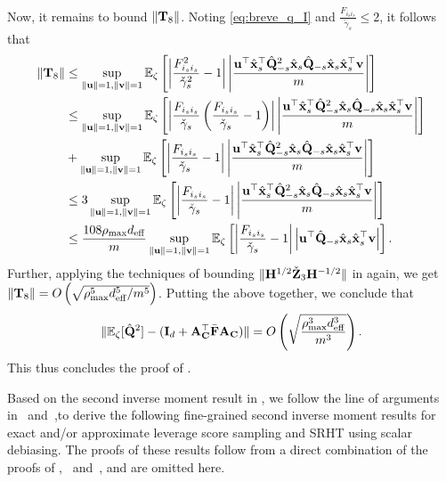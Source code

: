 \documentclass[11pt,a4paper]{article}
\begin{document}
Now, it remains to bound $\|\mathbf{T}_8\|$.  
Noting  \eqref{eq:breve_q_I} and  $\frac{F_{i_si_s}}{\check \gamma_s}\leq 2$, it follows that  
\begin{align}
    \|\mathbf{T}_8\|&\leq\sup\limits_{\|\mathbf{u}\|=1,\|\mathbf{v}\|=1} {\mathbb{E}}_{\zeta}\left[\left|\frac{F_{i_si_s}^2}{\check \gamma^2_s}-1\right|\left|\frac{\mathbf{u}^\top\hat{\mathbf{x}}_s^\top\hat{\mathbf{Q}}^2_{-s}\hat{\mathbf{x}}_s\hat{\mathbf{Q}}_{-s}\hat{\mathbf{x}}_s\hat{\mathbf{x}}_s^\top\mathbf{v}}{m}\right|\right]\nonumber\\
    &\leq\sup\limits_{\|\mathbf{u}\|=1,\|\mathbf{v}\|=1} {\mathbb{E}}_{\zeta}\left[\left|\frac{F_{i_si_s}}{\check \gamma_s}\left(\frac{F_{i_si_s}}{\check \gamma_s}-1\right)\right |\left|\frac{\mathbf{u}^\top\hat{\mathbf{x}}_s^\top\hat{\mathbf{Q}}^2_{-s}\hat{\mathbf{x}}_s\hat{\mathbf{Q}}_{-s}\hat{\mathbf{x}}_s\hat{\mathbf{x}}_s^\top\mathbf{v}}{m}\right|\right]\nonumber\\
    &+\sup\limits_{\|\mathbf{u}\|=1,\|\mathbf{v}\|=1} {\mathbb{E}}_{\zeta}\left[\left|\frac{F_{i_si_s}}{\check \gamma_s}-1\right |\left|\frac{\mathbf{u}^\top\hat{\mathbf{x}}_s^\top\hat{\mathbf{Q}}^2_{-s}\hat{\mathbf{x}}_s\hat{\mathbf{Q}}_{-s}\hat{\mathbf{x}}_s\hat{\mathbf{x}}_s^\top\mathbf{v}}{m}\right|\right]\nonumber\\
    &\leq3\sup\limits_{\|\mathbf{u}\|=1,\|\mathbf{v}\|=1} {\mathbb{E}}_{\zeta}\left[\left|\frac{F_{i_si_s}}{\check \gamma_s}-1\right |\left|\frac{\mathbf{u}^\top\hat{\mathbf{x}}_s^\top\hat{\mathbf{Q}}^2_{-s}\hat{\mathbf{x}}_s\hat{\mathbf{Q}}_{-s}\hat{\mathbf{x}}_s\hat{\mathbf{x}}_s^\top\mathbf{v}}{m}\right|\right]\nonumber\\
     &\leq\frac{108\rho_{\max} d_{\mathrm{eff}}}{m}\sup\limits_{\|\mathbf{u}\|=1,\|\mathbf{v}\|=1} {\mathbb{E}}_{\zeta}\left[\left|\frac{F_{i_si_s}}{\check \gamma_s}-1\right |\left|\mathbf{u}^\top\hat{\mathbf{Q}}_{-s}\hat{\mathbf{x}}_s\hat{\mathbf{x}}_s^\top\mathbf{v}\right|\right].\nonumber
\end{align}
Further, applying the techniques of bounding 
$ \|\mathbf{H}^{1/2}\check{\mathbf{Z}}_3\mathbf{H}^{-1/2}\|$ in  again, we get  $\|\mathbf{T}_8\| = O\left(\sqrt{\rho_{\max}^5d^5_{\mathrm{eff}}/m^5}\right)$. 
Putting the above together, we conclude that
\begin{equation*}
    \|  {\mathbb{E}}_{\zeta}[\hat{\mathbf{Q}}^2] - (\mathbf{I}_d+\mathbf{A}_{\mathbf{C}}^\top\bar{\mathbf{F}}\mathbf{A}_{\mathbf{C}})\|=O \left(\sqrt{\frac{\rho_{\max}^3d^3_{\mathrm{eff}}}{m^3}}\right).
\end{equation*}
This thus concludes the proof of .
\qedwhite
 
Based on the second inverse moment result in  , we follow the line of arguments in~ and~,to derive the following fine-grained second inverse moment results for exact and/or approximate leverage score sampling and SRHT using scalar debiasing. 
The proofs of these results follow from a direct combination of the proofs of , ~and~, and are omitted here.
\end{document}
